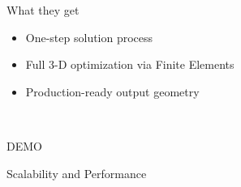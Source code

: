 \begin{frame}{What they get}	
\begin{itemize}
			\item One-step solution process	
			\item Full 3-D optimization via Finite Elements
			\item Production-ready output geometry
			\end{itemize}~\\
\end{frame}	

\begin{frame}{DEMO}

\end{frame}

\begin{frame}{Scalability and Performance}

\end{frame}

		
